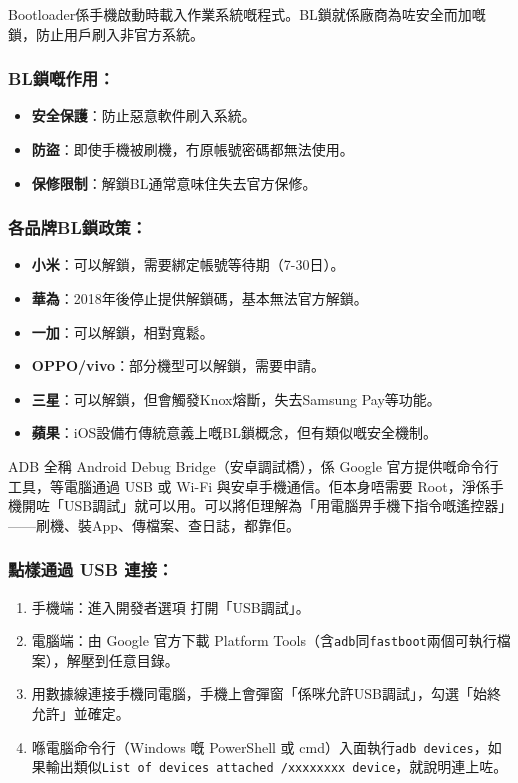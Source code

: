 
Bootloader係手機啟動時載入作業系統嘅程式。BL鎖就係廠商為咗安全而加嘅鎖，防止用戶刷入非官方系統。

\subsubsection*{BL鎖嘅作用：}

\begin{itemize}
  \item \textbf{安全保護}：防止惡意軟件刷入系統。
  \item \textbf{防盜}：即使手機被刷機，冇原帳號密碼都無法使用。
  \item \textbf{保修限制}：解鎖BL通常意味住失去官方保修。
\end{itemize}

\subsubsection*{各品牌BL鎖政策：}

\begin{itemize}
  \item \textbf{小米}：可以解鎖，需要綁定帳號等待期（7-30日）。
  \item \textbf{華為}：2018年後停止提供解鎖碼，基本無法官方解鎖。
  \item \textbf{一加}：可以解鎖，相對寬鬆。
  \item \textbf{OPPO/vivo}：部分機型可以解鎖，需要申請。
  \item \textbf{三星}：可以解鎖，但會觸發Knox熔斷，失去Samsung Pay等功能。
  \item \textbf{蘋果}：iOS設備冇傳統意義上嘅BL鎖概念，但有類似嘅安全機制。
\end{itemize}


ADB 全稱 Android Debug Bridge（安卓調試橋），係 Google 官方提供嘅命令行工具，等電腦通過 USB 或 Wi-Fi 與安卓手機通信。佢本身唔需要 Root，淨係手機開咗「USB調試」就可以用。可以將佢理解為「用電腦畀手機下指令嘅遙控器」——刷機、裝App、傳檔案、查日誌，都靠佢。

\subsubsection*{點樣通過 USB 連接：}

\begin{enumerate}
  \item 手機端：進入開發者選項 打開「USB調試」。
  \item 電腦端：由 Google 官方下載 Platform Tools（含\texttt{adb}同\texttt{fastboot}兩個可執行檔案），解壓到任意目錄。
  \item 用數據線連接手機同電腦，手機上會彈窗「係咪允許USB調試」，勾選「始終允許」並確定。
  \item 喺電腦命令行（Windows 嘅 PowerShell 或 cmd）入面執行\texttt{adb devices}，如果輸出類似\texttt{List of devices attached /\allowbreak  xxxxxxxx device}，就說明連上咗。
\end{enumerate}

